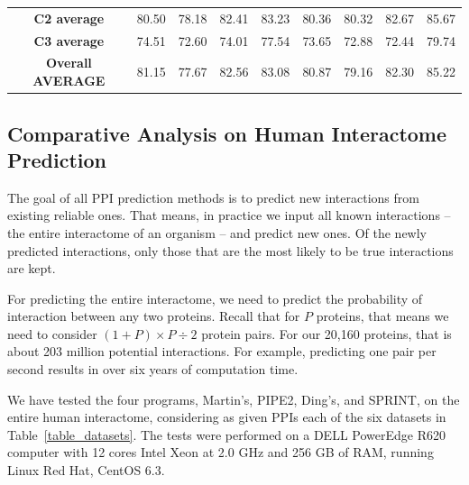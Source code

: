 \begin{table}[]
\begin{tabular}{|c|cccc|cccc|}
\cmidrule{1-1}    \textbf{C2 average} & \cellcolor[rgb]{ .631,  .741,  .561} 80.50 & \cellcolor[rgb]{ .886,  .937,  .855} 78.18 & \cellcolor[rgb]{ .42,  .58,  .314} 82.41 & \cellcolor[rgb]{ .329,  .51,  .208} 83.23 & \cellcolor[rgb]{ .882,  .937,  .851} 80.36 & \cellcolor[rgb]{ .886,  .937,  .855} 80.32 & \cellcolor[rgb]{ .643,  .753,  .573} 82.67 & \cellcolor[rgb]{ .329,  .51,  .208} 85.67 \\
\cmidrule{1-1}    \textbf{C3 average} & \cellcolor[rgb]{ .675,  .773,  .608} 74.51 & \cellcolor[rgb]{ .886,  .937,  .855} 72.60 & \cellcolor[rgb]{ .729,  .816,  .671} 74.01 & \cellcolor[rgb]{ .329,  .51,  .208} 77.54 & \cellcolor[rgb]{ .796,  .867,  .749} 73.65 & \cellcolor[rgb]{ .855,  .914,  .82} 72.88 & \cellcolor[rgb]{ .886,  .937,  .855} 72.44 & \cellcolor[rgb]{ .329,  .51,  .208} 79.74 \\
    \midrule
    \textbf{Overall AVERAGE} & \cellcolor[rgb]{ .529,  .667,  .443} 81.15 & \cellcolor[rgb]{ .886,  .937,  .855} 77.67 & \cellcolor[rgb]{ .384,  .553,  .271} 82.56 & \cellcolor[rgb]{ .329,  .51,  .208} 83.08 & \cellcolor[rgb]{ .729,  .82,  .675} 80.87 & \cellcolor[rgb]{ .886,  .937,  .855} 79.16 & \cellcolor[rgb]{ .6,  .718,  .522} 82.30 & \cellcolor[rgb]{ .329,  .51,  .208} 85.22 \\
    \bottomrule
    \end{tabular}%
\end{table}%
\subsection{Comparative Analysis on Human Interactome Prediction}
The goal of all PPI prediction methods is to predict new interactions from existing reliable ones. That means, in practice we input all known interactions -- the entire interactome of an organism -- and predict new ones. Of the newly predicted interactions, only those that are the most likely to be true interactions are kept. 

For predicting the entire interactome, we need to predict the probability of interaction between any two proteins. Recall that for $P$ proteins, that means we need to consider $(1+P)\times P\div2$ protein pairs. For our 20,160 proteins, that is about 203 million potential interactions. %
For example, predicting one pair per second results in over six years of computation time. 

We have tested the four programs, Martin's, PIPE2, Ding's, and SPRINT, on the entire human interactome, considering as given PPIs each of the six datasets in Table~\ref{table_datasets}. The tests were performed on a DELL PowerEdge R620 computer with 12 cores Intel Xeon at 2.0 GHz and 256 GB of RAM, running Linux Red Hat, CentOS 6.3. 

